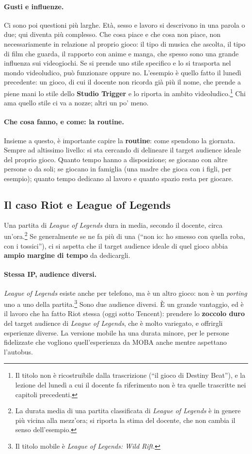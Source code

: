 \paragraph{Gusti e influenze.} Ci sono poi questioni più larghe. Età, sesso e
lavoro si descrivono in una parola o due; qui diventa più complesso. Che cosa
piace e che cosa non piace, non necessariamente in relazione al proprio
gioco: il tipo di musica che ascolta, il tipo di film che guarda, il rapporto
con anime e manga, che spesso sono una grande influenza sui videogiochi. Se si
prende uno stile specifico e lo si trasporta nel mondo videoludico, può
funzionare oppure no. L'esempio è quello fatto il lunedì precedente: un gioco,
di cui il docente non ricorda già più il nome, che prende a piene mani lo
stile dello \textbf{Studio Trigger} e lo riporta in ambito
videoludico.\footnote{Il titolo non è ricostruibile dalla trascrizione
(``il gioco di Destiny Beat''), e la lezione del lunedì a cui il docente fa
riferimento non è tra quelle trascritte nei capitoli precedenti.} Chi ama
quello stile ci va a nozze; altri un po' meno.

\paragraph{Che cosa fanno, e come: la routine.} Insieme a questo, è
importante capire la \textbf{routine}: come spendono la giornata. Sempre ad
altissimo livello: si sta cercando di delineare il target audience ideale del
proprio gioco. Quanto tempo hanno a disposizione; se giocano con altre
persone o da soli; se giocano in famiglia (una madre che gioca con i figli,
per esempio); quanto tempo dedicano al lavoro e quanto spazio resta per
giocare.

\subsection{Il caso Riot e League of Legends}

Una partita di \emph{League of Legends} dura in media, secondo il docente,
circa un'ora.\footnote{La durata media di una partita classificata di
\emph{League of Legends} è in genere più vicina alla mezz'ora; si riporta la
stima del docente, che non cambia il senso dell'esempio.} Se generalmente se
ne fa più di una (``non io: ho smesso con quella roba, con i tossici''), ci si
aspetta che il target audience ideale di quel gioco abbia \textbf{ampio
margine di tempo} da dedicargli.

\paragraph{Stessa IP, audience diversi.} \emph{League of Legends} esiste anche
per telefono, ma è un altro gioco: non è un \emph{porting} uno a uno della
partita.\footnote{Il titolo mobile è \emph{League of Legends: Wild Rift}.}
Sono due audience diversi. È un grande vantaggio, ed è il lavoro che ha fatto
Riot stessa (oggi sotto Tencent): prendere lo \textbf{zoccolo duro} del target
audience di \emph{League of Legends}, che è molto variegato, e offrirgli
esperienze diverse. La versione mobile ha una durata minore, per le persone
fidelizzate che vogliono quell'esperienza da MOBA anche mentre aspettano
l'autobus.

